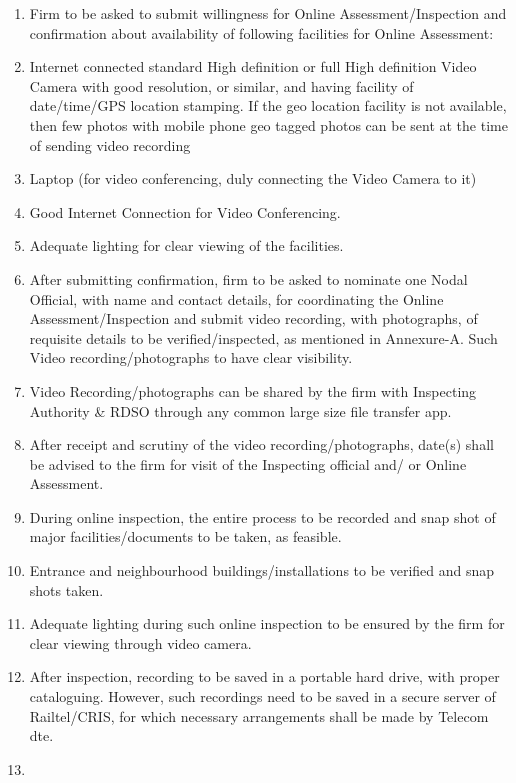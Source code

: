 \documentclass[
]{article}
\begin{document}
\begin{enumerate}
\def\labelenumi{\arabic{enumi}.}
\item
  Firm to be asked to submit willingness for Online
  Assessment/Inspection and confirmation about availability of following
  facilities for Online Assessment:
\item
  Internet connected standard High definition or full High definition
  Video Camera with good resolution, or similar, and having facility of
  date/time/GPS location stamping. If the geo location facility is not
  available, then few photos with mobile phone geo tagged photos can be
  sent at the time of sending video recording
\item
  Laptop (for video conferencing, duly connecting the Video Camera to
  it)
\item
  Good Internet Connection for Video Conferencing.
\item
  Adequate lighting for clear viewing of the facilities.
\item
  After submitting confirmation, firm to be asked to nominate one Nodal
  Official, with name and contact details, for coordinating the Online
  Assessment/Inspection and submit video recording, with photographs, of
  requisite details to be verified/inspected, as mentioned in
  Annexure-A. Such Video recording/photographs to have clear visibility.
\item
  Video Recording/photographs can be shared by the firm with Inspecting
  Authority \& RDSO through any common large size file transfer app.
\item
  After receipt and scrutiny of the video recording/photographs, date(s)
  shall be advised to the firm for visit of the Inspecting official and/
  or Online Assessment.
\item
  During online inspection, the entire process to be recorded and snap
  shot of major facilities/documents to be taken, as feasible.
\item
  Entrance and neighbourhood buildings/installations to be verified and
  snap shots taken.
\item
  Adequate lighting during such online inspection to be ensured by the
  firm for clear viewing through video camera.
\item
  After inspection, recording to be saved in a portable hard drive, with
  proper cataloguing. However, such recordings need to be saved in a
  secure server of Railtel/CRIS, for which necessary arrangements shall
  be made by Telecom dte.
\item

\end{enumerate}
\end{document}
